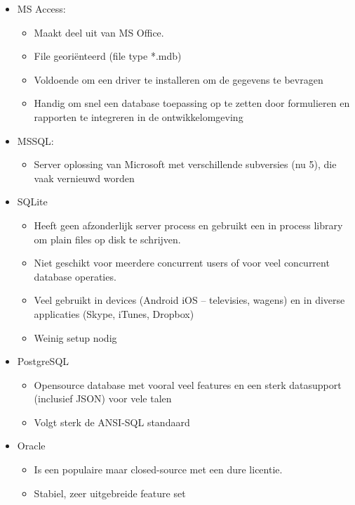 \documentclass{article}
\begin{document}
\begin{itemize}
    \item MS Access:
    \begin{itemize}
        \item Maakt deel uit van MS Office.
        \item File georiënteerd (file type *.mdb)
        \item Voldoende om een driver te installeren om de gegevens te bevragen
        \item Handig om snel een database toepassing op te zetten door formulieren en rapporten te integreren in de ontwikkelomgeving
    \end{itemize}
    \item MSSQL:
    \begin{itemize}
        \item Server oplossing van Microsoft met verschillende subversies (nu 5), die vaak vernieuwd worden
    \end{itemize}
    \item SQLite
    \begin{itemize}
        \item Heeft geen afzonderlijk server process en gebruikt een in process library om plain files op disk te schrijven.
        \item Niet geschikt voor meerdere concurrent users of voor veel concurrent database operaties.
        \item Veel gebruikt in devices (Android iOS – televisies, wagens) en in diverse applicaties (Skype, iTunes, Dropbox)
        \item Weinig setup nodig
    \end{itemize}
    \item PostgreSQL
    \begin{itemize}
        \item Opensource database met vooral veel features en een sterk datasupport (inclusief JSON) voor vele talen
        \item Volgt sterk de ANSI-SQL standaard
    \end{itemize}
    \item Oracle
    \begin{itemize}
        \item Is een populaire maar closed-source met een dure licentie.
        \item Stabiel, zeer uitgebreide feature set
    \end{itemize}
\end{itemize}
\end{document}
